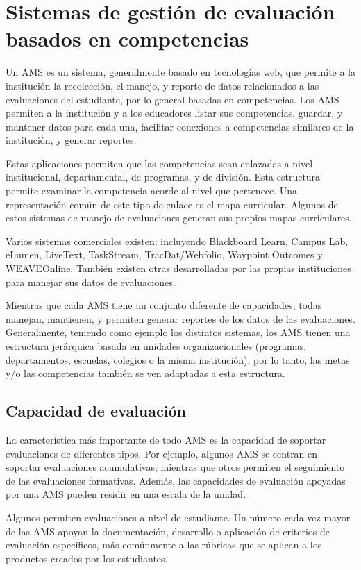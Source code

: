 \section{Sistemas de gestión de evaluación basados en competencias}
Un AMS es un sistema, generalmente basado en tecnologías web, que permite a la institución la recolección, el manejo, y reporte de datos relacionados a las evaluaciones del estudiante, por lo general basadas en competencias. Los AMS permiten a la institución y a los educadores listar sus competencias, guardar, y mantener datos para cada una, facilitar conexiones a competencias similares de la institución, y generar reportes\citep{cartwright2009student}.

Estas aplicaciones permiten que las competencias sean enlazadas a nivel institucional, departamental, de programas, y de división. Esta estructura permite examinar la competencia
acorde al nivel que pertenece. Una representación común de este tipo de enlace es el mapa curricular\citep{oakleaf_choosing_2013}. Algunos de estos sistemas de manejo de evaluaciones generan sus propios mapas curriculares.

Varios sistemas comerciales existen; incluyendo Blackboard Learn, Campus Lab, eLumen, LiveText, TaskStream, TracDat/Webfolio, Waypoint Outcomes y WEAVEOnline. También existen otras desarrolladas por las propias instituciones para manejar sus datos de evaluaciones.

Mientras que cada AMS tiene un conjunto diferente de capacidades, todas manejan, mantienen, y permiten generar reportes de los datos de las evaluaciones. Generalmente, teniendo como ejemplo los distintos sistemas, los AMS tienen una estructura jerárquica basada en unidades organizacionales (programas, departamentos, escuelas, colegios o la misma institución), por lo tanto, las metas y/o las competencias también se ven adaptadas a esta estructura.

\subsection{Capacidad de evaluación}
La característica más importante de todo AMS es la capacidad de soportar evaluaciones de diferentes tipos. Por ejemplo, algunos AMS se centran en soportar evaluaciones acumulativas; mientras que otros permiten el seguimiento de las evaluaciones formativas. Además, las capacidades de evaluación apoyadas por una AMS pueden residir en una escala de la unidad.

Algunos permiten evaluaciones a nivel de estudiante. Un número cada vez mayor de las AMS apoyan la documentación, desarrollo o aplicación de criterios de evaluación específicos, más comúnmente a las rúbricas que se aplican a los productos creados por los estudiantes.

